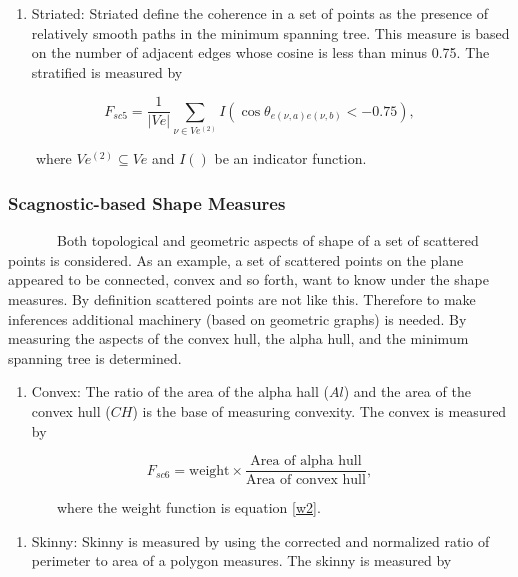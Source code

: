\documentclass{article}
\begin{document}
\begin{enumerate}
\def\labelenumi{\alph{enumi})}
\setcounter{enumi}{21}
\tightlist
\item
  Striated: Striated define the coherence in a set of points as the
  presence of relatively smooth paths in the minimum spanning tree. This
  measure is based on the number of adjacent edges whose cosine is less
  than minus 0.75. The stratified is measured by
\end{enumerate}

\begin{equation}
    F_{sc5} = \frac{1}{|Ve|}\sum_{\nu \in Ve^{(2)}}^{}I(\cos\theta_{e(\nu,a)e(\nu,b)}<-0.75),
\end{equation}

~~~~where \(Ve^{(2)} \subseteq Ve\) and \(I()\) be an indicator
function.

\hypertarget{scagnostic-based-shape-measures}{%
\subsubsection{Scagnostic-based Shape
Measures}\label{scagnostic-based-shape-measures}}

~~~~~~~Both topological and geometric aspects of shape of a set of
scattered points is considered. As an example, a set of scattered points
on the plane appeared to be connected, convex and so forth, want to know
under the shape measures. By definition scattered points are not like
this. Therefore to make inferences additional machinery (based on
geometric graphs) is needed. By measuring the aspects of the convex
hull, the alpha hull, and the minimum spanning tree is determined.

\begin{enumerate}
\def\labelenumi{\roman{enumi})}
\tightlist
\item
  Convex: The ratio of the area of the alpha hall (\(Al\)) and the area
  of the convex hull (\(CH\)) is the base of measuring convexity. The
  convex is measured by
\end{enumerate}

\begin{equation}
    F_{sc6} = \text{weight} \times \frac{\text{Area of alpha hull}}{\text{Area of convex hull}},
\end{equation}

~~~~~~~where the weight function is equation \ref{w2}.

\begin{enumerate}
\def\labelenumi{\roman{enumi})}
\setcounter{enumi}{1}
\tightlist
\item
  Skinny: Skinny is measured by using the corrected and normalized ratio
  of perimeter to area of a polygon measures. The skinny is measured by
\end{enumerate}
\end{document}
